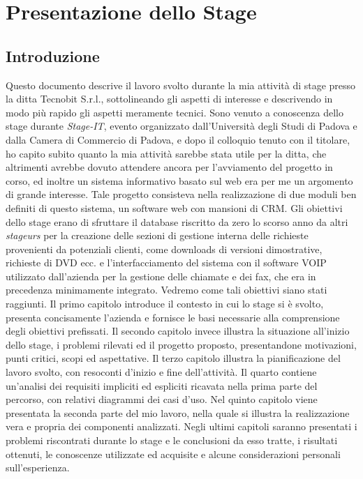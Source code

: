 \mainmatter

\chapter{Presentazione dello Stage}
\section{Introduzione}
Questo documento descrive il lavoro svolto durante la mia attivit\` a di stage
presso la ditta Tecnobit S.r.l., sottolineando gli aspetti di interesse e
descrivendo in modo pi\` u rapido gli aspetti meramente tecnici. Sono venuto a
conoscenza dello stage durante \textit{Stage-IT}, evento organizzato
dall'Universit\` a degli Studi di Padova e dalla Camera di Commercio di Padova,
e dopo il colloquio tenuto con il titolare, ho capito subito quanto la mia
attivit\` a sarebbe stata utile per la ditta, che altrimenti avrebbe dovuto
attendere ancora per l'avviamento del progetto in corso, ed inoltre un sistema
informativo basato sul web era per me un argomento di grande interesse. Tale
progetto consisteva nella realizzazione di due moduli ben definiti di questo
sistema, un software web con mansioni di CRM. Gli obiettivi dello stage erano di
sfruttare il database riscritto da zero lo scorso anno da altri
\textit{stageurs} per la creazione delle sezioni di gestione interna delle
richieste provenienti da potenziali clienti, come downloads di versioni
dimostrative, richieste di DVD ecc. e l'interfacciamento del sistema con il
software VOIP utilizzato dall'azienda per la gestione delle chiamate e dei fax,
che era in precedenza minimamente integrato. Vedremo come tali obiettivi
siano stati raggiunti. Il primo capitolo introduce il contesto in cui lo
stage si \` e svolto, presenta concisamente l'azienda e fornisce le basi
necessarie alla comprensione degli obiettivi prefissati. Il secondo capitolo
invece illustra la situazione all'inizio dello stage, i problemi rilevati ed il
progetto proposto, presentandone motivazioni, punti critici, scopi ed
aspettative.  Il terzo capitolo illustra la pianificazione del lavoro svolto,
con resoconti d'inizio e fine dell'attivit\` a.  Il quarto contiene un'analisi
dei requisiti impliciti ed espliciti ricavata nella prima parte del percorso,
con relativi diagrammi dei casi d'uso. Nel quinto capitolo viene presentata la
seconda parte del mio lavoro, nella quale si illustra la realizzazione vera e
propria dei componenti analizzati. Negli ultimi capitoli saranno presentati i
problemi riscontrati durante lo stage e le conclusioni da esso tratte, i
risultati ottenuti, le conoscenze utilizzate ed acquisite e alcune
considerazioni personali sull'esperienza.

